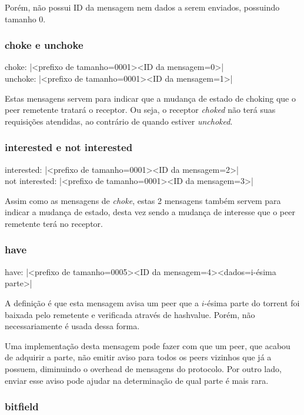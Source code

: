 Porém, não possui ID da mensagem nem dados a serem enviados, possuindo tamanho 0.

\subsubsection*{choke e unchoke}

choke: \bverb|<prefixo de tamanho=0001><ID da mensagem=0>| \\
unchoke: \bverb|<prefixo de tamanho=0001><ID da mensagem=1>|

Estas mensagens servem para indicar que a mudança de estado de choking que o \gls*{peer}
remetente tratará o receptor. Ou seja, o receptor \emph{choked} não terá suas
requisições atendidas, ao contrário de quando estiver \emph{unchoked}.

\subsubsection*{interested e not interested}

interested: \bverb|<prefixo de tamanho=0001><ID da mensagem=2>| \\
not interested: \bverb|<prefixo de tamanho=0001><ID da mensagem=3>|

Assim como as mensagens de \emph{choke}, estas 2 mensagens também servem para indicar a
mudança de estado, desta vez sendo a mudança de interesse que o \gls*{peer} remetente
terá no receptor.

\subsubsection*{have}

have: \bverb|<prefixo de tamanho=0005><ID da mensagem=4><dados=i-ésima parte>|

A definição é que esta mensagem avisa um \gls*{peer} que a $i$-ésima parte do
\gls*{torrent} foi baixada pelo remetente e verificada através de \gls*{hashvalue}.
Porém, não necessariamente é usada dessa forma.

Uma implementação desta mensagem pode fazer com que um \gls*{peer}, que acabou de
adquirir a parte, não emitir aviso para todos os \gls*{peers} vizinhos que já a
possuem, diminuindo o \gls{overhead} de mensagens do protocolo. Por outro lado, enviar
esse aviso pode ajudar na determinação de qual parte é mais rara.

\subsubsection*{bitfield}

